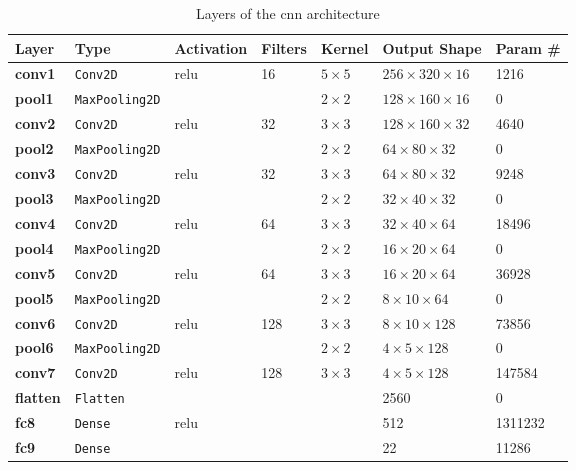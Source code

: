 \begin{table}
  \caption{Layers of the \acrshort{cnn} architecture}
  \label{tab:arch}
  \centering
  \begin{tabular}{lllllll}
    \toprule
    \textbf{Layer} & \textbf{Type} & \textbf{Activation} & \textbf{Filters} & \textbf{Kernel} & \textbf{Output Shape} & \textbf{Param \#} \\
    \midrule
    \textbf{conv1} & \texttt{Conv2D} & \acrshort{relu} & \num{16} & $5\times 5$ & $256\times 320\times 16$ & \num{1216} \\
    \textbf{pool1} & \texttt{MaxPooling2D} &  &  & $2\times 2$ & $128\times 160\times 16$ & \num{0} \\
    \midrule
    \textbf{conv2} & \texttt{Conv2D} & \acrshort{relu} & \num{32} & $3\times 3$ & $128\times 160\times 32$ & \num{4640} \\
    \textbf{pool2} & \texttt{MaxPooling2D} &  &  & $2\times 2$ & $64\times 80\times 32$ & \num{0} \\
    \midrule
    \textbf{conv3} & \texttt{Conv2D} & \acrshort{relu} & \num{32} & $3\times 3$ & $64\times 80\times 32$ & \num{9248} \\
    \textbf{pool3} & \texttt{MaxPooling2D} &  &  & $2\times 2$ & $32\times 40\times 32$ & \num{0} \\
    \midrule
    \textbf{conv4} & \texttt{Conv2D} & \acrshort{relu} & \num{64} & $3\times 3$ & $32\times 40\times 64$ & \num{18496} \\
    \textbf{pool4} & \texttt{MaxPooling2D} &  &  & $2\times 2$ & $16\times 20\times 64$ & \num{0} \\
    \midrule
    \textbf{conv5} & \texttt{Conv2D} & \acrshort{relu} & \num{64} & $3\times 3$ & $16\times 20\times 64$ & \num{36928} \\
    \textbf{pool5} & \texttt{MaxPooling2D} &  &  & $2\times 2$ & $8\times 10\times 64$ & \num{0} \\
    \midrule
    \textbf{conv6} & \texttt{Conv2D} & \acrshort{relu} & \num{128} & $3\times 3$ & $8\times 10\times 128$ & \num{73856} \\
    \textbf{pool6} & \texttt{MaxPooling2D} &  &  & $2\times 2$ & $4\times 5\times 128$ & \num{0} \\
    \midrule
    \textbf{conv7} & \texttt{Conv2D} & \acrshort{relu} & \num{128} & $3\times 3$ & $4\times 5\times 128$ & \num{147584} \\
    \midrule
    \textbf{flatten} & \texttt{Flatten} &  &  &  & \num{2560} & \num{0} \\
    \textbf{fc8} & \texttt{Dense} & \acrshort{relu} &  &  & \num{512} & \num{1311232} \\
    \textbf{fc9} & \texttt{Dense} &  &  &  & \num{22} & \num{11286} \\
    \bottomrule
  \end{tabular}
\end{table}

